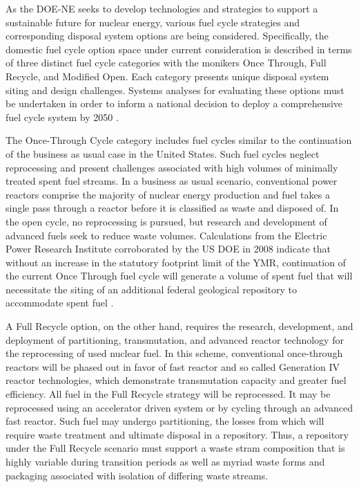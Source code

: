 As the DOE-NE seeks to develop technologies and strategies to support a 
sustainable future for nuclear energy, various fuel cycle strategies and 
corresponding disposal system options are being considered.  Specifically, the 
domestic fuel cycle option space under current consideration is described in 
terms of three distinct fuel cycle categories with the monikers Once Through, 
Full Recycle, and Modified Open. Each category presents unique disposal system 
siting and design challenges. Systems analyses for evaluating these options must 
be undertaken in order to inform a national decision to deploy a comprehensive 
fuel cycle system by 2050 \cite{doe_nuclear_2010}. 


The Once-Through Cycle category includes fuel cycles similar to the continuation 
of the business as usual case in the United States.
Such fuel cycles neglect reprocessing and present challenges associated with 
high volumes of minimally treated spent fuel streams.  In a business as usual 
scenario, conventional power reactors comprise the majority of nuclear energy 
production and fuel takes a single pass through a reactor before it is 
classified as waste and disposed of. In the open cycle, no reprocessing is 
pursued, but research and development of advanced fuels seek to reduce waste 
volumes. Calculations from the Electric Power Research Institute corroborated by 
the \gls{US} \gls{DOE} in 2008 indicate that without an increase in the statutory 
footprint limit of the \gls{YMR}, continuation of the current Once Through fuel 
cycle will generate a volume of spent fuel that will necessitate
the siting of an additional federal geological repository to accommodate spent 
fuel \cite{kessler_room_2006, doe_report_2008}. 


A Full Recycle option, on the other hand, requires the research, development, 
and deployment of partitioning, transmutation, and advanced reactor technology 
for the reprocessing of used nuclear fuel.  In this scheme, conventional 
once-through reactors will be phased out in favor of fast reactor and so called 
Generation IV reactor technologies, which demonstrate transmutation capacity and 
greater fuel efficiency. All fuel in the Full Recycle strategy will be 
reprocessed. It may be reprocessed using  an accelerator driven system or by 
cycling through an advanced fast reactor. Such fuel may undergo partitioning, 
the losses from which will require waste treatment and ultimate disposal in a 
repository. Thus, a repository under the Full Recycle scenario must support
a waste stram composition that is highly variable during transition periods as 
well as myriad waste forms and packaging associated with isolation of differing 
waste streams.

